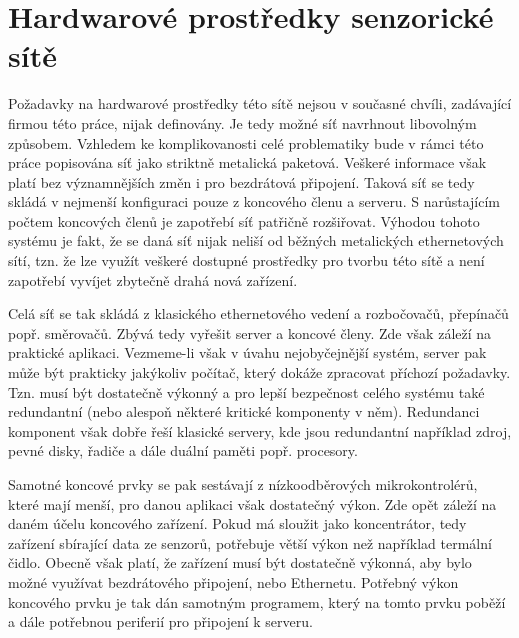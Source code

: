 \section{Hardwarové prostředky senzorické sítě}
Požadavky na hardwarové prostředky této sítě nejsou v současné chvíli, zadávající firmou této práce, nijak definovány. Je tedy možné síť navrhnout libovolným způsobem. Vzhledem ke komplikovanosti celé problematiky bude v rámci této práce popisována síť jako striktně metalická paketová. Veškeré informace však platí bez významnějších změn i pro bezdrátová připojení. Taková síť se tedy skládá v nejmenší konfiguraci pouze z koncového členu a serveru. S narůstajícím počtem koncových členů je zapotřebí síť patřičně rozšiřovat. Výhodou tohoto systému je fakt, že se daná síť nijak neliší od běžných metalických ethernetových sítí, tzn. že lze využít veškeré dostupné prostředky pro tvorbu této sítě a není zapotřebí vyvíjet zbytečně drahá nová zařízení.

Celá síť se tak skládá z klasického ethernetového vedení a rozbočovačů, přepínačů popř. směrovačů. Zbývá tedy vyřešit server a koncové členy. Zde však záleží na praktické aplikaci. Vezmeme-li však v úvahu nejobyčejnější systém, server pak může být prakticky jakýkoliv počítač, který dokáže zpracovat příchozí požadavky. Tzn. musí být dostatečně výkonný a pro lepší bezpečnost celého systému také redundantní (nebo alespoň některé kritické komponenty v něm). Redundanci komponent však dobře řeší klasické servery, kde jsou redundantní například zdroj, pevné disky, řadiče a dále duální paměti popř. procesory.

Samotné koncové prvky se pak sestávají z nízkoodběrových mikrokontrolérů,  které mají menší, pro danou aplikaci však dostatečný výkon. Zde opět záleží na daném účelu koncového zařízení. Pokud má sloužit jako koncentrátor, tedy zařízení sbírající data ze senzorů, potřebuje větší výkon než například termální čidlo. Obecně však platí, že zařízení musí být dostatečně výkonná, aby bylo možné využívat bezdrátového připojení, nebo Ethernetu.  Potřebný výkon koncového prvku je tak dán samotným programem, který na tomto prvku poběží a dále potřebnou periferií pro připojení k serveru.

